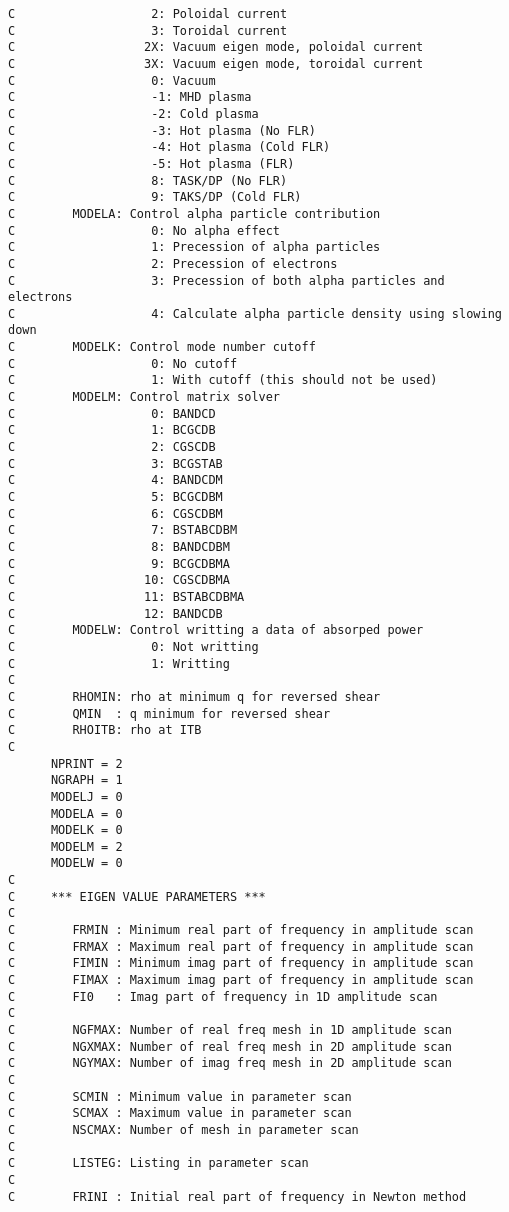 \documentclass[11pt]{jarticle}
\begin{document}
\begin{verbatim}
C                   2: Poloidal current
C                   3: Toroidal current
C                  2X: Vacuum eigen mode, poloidal current
C                  3X: Vacuum eigen mode, toroidal current
C                   0: Vacuum
C                   -1: MHD plasma
C                   -2: Cold plasma
C                   -3: Hot plasma (No FLR)
C                   -4: Hot plasma (Cold FLR)
C                   -5: Hot plasma (FLR)
C                   8: TASK/DP (No FLR)
C                   9: TAKS/DP (Cold FLR)
C        MODELA: Control alpha particle contribution
C                   0: No alpha effect
C                   1: Precession of alpha particles
C                   2: Precession of electrons
C                   3: Precession of both alpha particles and electrons
C                   4: Calculate alpha particle density using slowing down
C        MODELK: Control mode number cutoff
C                   0: No cutoff
C                   1: With cutoff (this should not be used)
C        MODELM: Control matrix solver
C                   0: BANDCD
C                   1: BCGCDB
C                   2: CGSCDB
C                   3: BCGSTAB
C                   4: BANDCDM
C                   5: BCGCDBM
C                   6: CGSCDBM
C                   7: BSTABCDBM
C                   8: BANDCDBM
C                   9: BCGCDBMA
C                  10: CGSCDBMA
C                  11: BSTABCDBMA
C                  12: BANDCDB
C        MODELW: Control writting a data of absorped power
C                   0: Not writting
C                   1: Writting
C
C        RHOMIN: rho at minimum q for reversed shear
C        QMIN  : q minimum for reversed shear
C        RHOITB: rho at ITB
C
      NPRINT = 2
      NGRAPH = 1
      MODELJ = 0
      MODELA = 0
      MODELK = 0
      MODELM = 2
      MODELW = 0
C
C     *** EIGEN VALUE PARAMETERS ***
C
C        FRMIN : Minimum real part of frequency in amplitude scan
C        FRMAX : Maximum real part of frequency in amplitude scan
C        FIMIN : Minimum imag part of frequency in amplitude scan
C        FIMAX : Maximum imag part of frequency in amplitude scan
C        FI0   : Imag part of frequency in 1D amplitude scan
C
C        NGFMAX: Number of real freq mesh in 1D amplitude scan
C        NGXMAX: Number of real freq mesh in 2D amplitude scan
C        NGYMAX: Number of imag freq mesh in 2D amplitude scan
C
C        SCMIN : Minimum value in parameter scan
C        SCMAX : Maximum value in parameter scan
C        NSCMAX: Number of mesh in parameter scan
C
C        LISTEG: Listing in parameter scan
C
C        FRINI : Initial real part of frequency in Newton method

\end{verbatim}
\end{document}
